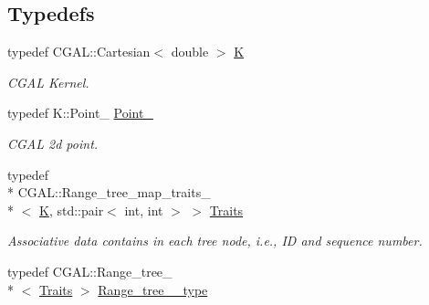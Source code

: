 \subsection*{Typedefs}
\begin{DoxyCompactItemize}
\item 
\hypertarget{namespaceSigSpatial2013_ac8dd3c84f0c3e96c95be4d4e6cf4325c}{typedef C\-G\-A\-L\-::\-Cartesian$<$ double $>$ \hyperlink{namespaceSigSpatial2013_ac8dd3c84f0c3e96c95be4d4e6cf4325c}{K}}\label{namespaceSigSpatial2013_ac8dd3c84f0c3e96c95be4d4e6cf4325c}

\begin{DoxyCompactList}\small\item\em C\-G\-A\-L Kernel. \end{DoxyCompactList}\item 
\hypertarget{namespaceSigSpatial2013_a4d50a6d98aab2aa905654c8c2e3e3c58}{typedef K\-::\-Point\-\_ \hyperlink{namespaceSigSpatial2013_a4d50a6d98aab2aa905654c8c2e3e3c58}{Point\-\_}}\label{namespaceSigSpatial2013_a4d50a6d98aab2aa905654c8c2e3e3c58}

\begin{DoxyCompactList}\small\item\em C\-G\-A\-L 2d point. \end{DoxyCompactList}\item 
\hypertarget{namespaceSigSpatial2013_a1f1ea2e2cdbee6d560fd28d9332b4a9e}{typedef \\*
C\-G\-A\-L\-::\-Range\-\_\-tree\-\_\-map\-\_\-traits\-\_\\*
$<$ \hyperlink{namespaceSigSpatial2013_ac8dd3c84f0c3e96c95be4d4e6cf4325c}{K}, std\-::pair$<$ int, int $>$ $>$ \hyperlink{namespaceSigSpatial2013_a1f1ea2e2cdbee6d560fd28d9332b4a9e}{Traits}}\label{namespaceSigSpatial2013_a1f1ea2e2cdbee6d560fd28d9332b4a9e}

\begin{DoxyCompactList}\small\item\em Associative data contains in each tree node, i.\-e., I\-D and sequence number. \end{DoxyCompactList}\item 
\hypertarget{namespaceSigSpatial2013_a1f24a632c09e5f10b138ef0096857e43}{typedef C\-G\-A\-L\-::\-Range\-\_\-tree\-\_\\*
$<$ \hyperlink{namespaceSigSpatial2013_a1f1ea2e2cdbee6d560fd28d9332b4a9e}{Traits} $>$ \hyperlink{namespaceSigSpatial2013_a1f24a632c09e5f10b138ef0096857e43}{Range\-\_\-tree\-\_\-\_\-type}}\label{namespaceSigSpatial2013_a1f24a632c09e5f10b138ef0096857e43}


\end{DoxyCompactItemize}
